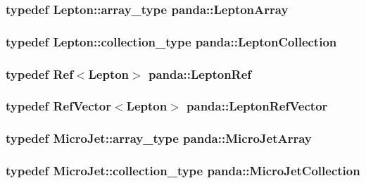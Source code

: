 \hypertarget{namespacepanda_a352f1280da7ec8487c4925e39d067e8d}{
\subsubsection[{LeptonArray}]{\setlength{\rightskip}{0pt plus 5cm}typedef {\bf Lepton::array\_\-type} {\bf panda::LeptonArray}}}
\label{namespacepanda_a352f1280da7ec8487c4925e39d067e8d}
\hypertarget{namespacepanda_ac1e22e7d8b50cda812e91c0b79c467fb}{
\subsubsection[{LeptonCollection}]{\setlength{\rightskip}{0pt plus 5cm}typedef {\bf Lepton::collection\_\-type} {\bf panda::LeptonCollection}}}
\label{namespacepanda_ac1e22e7d8b50cda812e91c0b79c467fb}
\hypertarget{namespacepanda_a016f3e7c0e8914121bb07d9619dfee8b}{
\subsubsection[{LeptonRef}]{\setlength{\rightskip}{0pt plus 5cm}typedef {\bf Ref}$<${\bf Lepton}$>$ {\bf panda::LeptonRef}}}
\label{namespacepanda_a016f3e7c0e8914121bb07d9619dfee8b}
\hypertarget{namespacepanda_a494bd902cbae8bbd1171f3d8d7f64bf1}{
\subsubsection[{LeptonRefVector}]{\setlength{\rightskip}{0pt plus 5cm}typedef {\bf RefVector}$<${\bf Lepton}$>$ {\bf panda::LeptonRefVector}}}
\label{namespacepanda_a494bd902cbae8bbd1171f3d8d7f64bf1}
\hypertarget{namespacepanda_a63773b13485efcf04c5c4f05ec063a72}{
\subsubsection[{MicroJetArray}]{\setlength{\rightskip}{0pt plus 5cm}typedef {\bf MicroJet::array\_\-type} {\bf panda::MicroJetArray}}}
\label{namespacepanda_a63773b13485efcf04c5c4f05ec063a72}
\hypertarget{namespacepanda_ab230de44162d083734a6dd7d1f290908}{
\subsubsection[{MicroJetCollection}]{\setlength{\rightskip}{0pt plus 5cm}typedef {\bf MicroJet::collection\_\-type} {\bf panda::MicroJetCollection}}}
